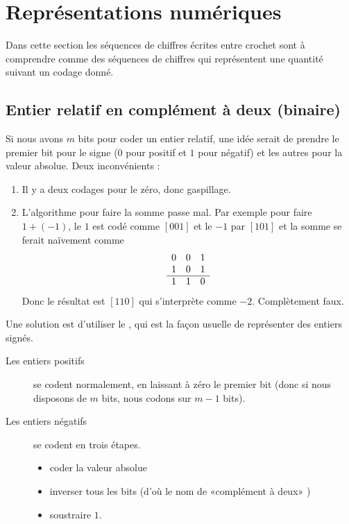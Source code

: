 \section{Représentations numériques}

Dans cette section les séquences de chiffres écrites entre crochet sont à comprendre comme des séquences de chiffres qui représentent une quantité suivant un codage donné.

\subsection{Entier relatif en complément à deux (binaire)}

Si nous avons \( m\) bits pour coder un entier relatif, une idée serait de prendre le premier bit pour le signe (\( 0\) pour positif et \( 1\) pour négatif) et les autres pour la valeur absolue. Deux inconvénients :
\begin{enumerate}
    \item
        Il y a deux codages pour le zéro, donc gaspillage.
    \item
        L'algorithme pour faire la somme passe mal. Par exemple pour faire \( 1+(-1)\), le \( 1\) est codé comme \( [001]\) et le \( -1\) par \( [101]\) et la somme se ferait naïvement comme
        \begin{equation*}
            \begin{array}[]{ccc}
                0&0&1\\
                1&0&1\\
                \hline
                1&1&0\\
            \end{array}
        \end{equation*}
        Donc le résultat est \( [110]\) qui s'interprète comme \( -2\). Complètement faux.
\end{enumerate}
Une solution est d'utiliser le , qui est la façon usuelle de représenter des entiers signés. 
\begin{description}
    \item[Les entiers positifs] se codent normalement, en laissant à zéro le premier bit (donc si nous disposons de \( m\) bits, nous codons sur \( m-1\) bits).
    \item[Les entiers négatifs] se codent en trois étapes.
        \begin{itemize}
            \item coder la valeur absolue
            \item inverser tous les bits (d'où le nom de «complément à deux» )
            \item soustraire \( 1\).
        \end{itemize}
\end{description}

